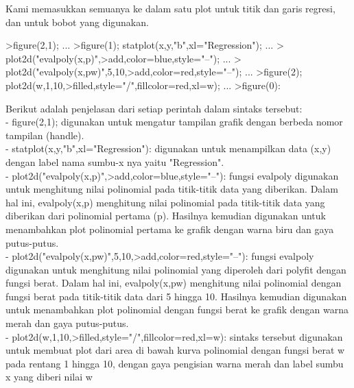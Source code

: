 \documentclass[a4paper,10pt]{article}
\begin{document}
\begin{eulernotebook}
\begin{eulercomment}
\begin{eulercomment}
\begin{eulercomment}
\begin{eulercomment}
\begin{eulercomment}
\begin{eulercomment}
\begin{eulercomment}
\begin{eulercomment}
\begin{eulercomment}
\begin{eulercomment}
\begin{eulercomment}
\begin{eulercomment}
\begin{eulercomment}
\begin{eulercomment}
\begin{eulercomment}
\begin{eulercomment}
\begin{eulercomment}
Kami memasukkan semuanya ke dalam satu plot untuk titik dan garis
regresi, dan untuk bobot yang digunakan.
\end{eulercomment}
\begin{eulerprompt}
>figure(2,1);  ...
>figure(1); statplot(x,y,"b",xl="Regression"); ...
>  plot2d("evalpoly(x,p)",>add,color=blue,style="--"); ...
>  plot2d("evalpoly(x,pw)",5,10,>add,color=red,style="--"); ...
>figure(2); plot2d(w,1,10,>filled,style="/",fillcolor=red,xl=w); ...
>figure(0):
\end{eulerprompt}
\begin{eulercomment}
Berikut adalah penjelasan dari setiap perintah dalam sintaks tersebut:\\
- figure(2,1); digunakan untuk mengatur tampilan grafik dengan berbeda
nomor tampilan (handle).\\
- statplot(x,y,"b",xl="Regression"): digunakan untuk menampilkan data
(x,y) dengan label nama sumbu-x nya yaitu "Regression".\\
- plot2d("evalpoly(x,p)",\textgreater{}add,color=blue,style="--"): fungsi evalpoly
digunakan untuk menghitung nilai polinomial pada titik-titik data yang
diberikan. Dalam hal ini, evalpoly(x,p) menghitung nilai polinomial
pada titik-titik data yang diberikan dari polinomial pertama (p).
Hasilnya kemudian digunakan untuk menambahkan plot polinomial pertama
ke grafik dengan warna biru dan gaya putus-putus.\\
- plot2d("evalpoly(x,pw)",5,10,\textgreater{}add,color=red,style="--"): fungsi
evalpoly digunakan untuk menghitung nilai polinomial yang diperoleh
dari polyfit dengan fungsi berat. Dalam hal ini, evalpoly(x,pw)
menghitung nilai polinomial dengan fungsi berat pada titik-titik data
dari 5 hingga 10. Hasilnya kemudian digunakan untuk menambahkan plot
polinomial dengan fungsi berat ke grafik dengan warna merah dan gaya
putus-putus.\\
- plot2d(w,1,10,\textgreater{}filled,style="/",fillcolor=red,xl=w): sintaks
tersebut  digunakan untuk membuat plot dari area di bawah kurva
polinomial dengan fungsi berat w pada rentang 1 hingga 10, dengan gaya
pengisian warna merah dan label sumbu x yang diberi nilai w
\end{eulercomment}
\begin{eulercomment}


\end{eulercomment}
\end{eulercomment}
\end{eulercomment}
\end{eulercomment}
\end{eulercomment}
\end{eulercomment}
\end{eulercomment}
\end{eulercomment}
\end{eulercomment}
\end{eulercomment}
\end{eulercomment}
\end{eulercomment}
\end{eulercomment}
\end{eulercomment}
\end{eulercomment}
\end{eulercomment}
\end{eulercomment}
\end{eulernotebook}
\end{document}
